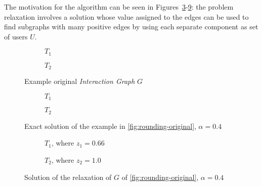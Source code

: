 The motivation for the algorithm can be seen in
Figures~\ref{fig:rounding-original}-\ref{fig:rounding-relaxed}: the problem
relaxation involves a solution whose value assigned to the edges can be used to
find subgraphs with many positive edges by using each separate component as set
of users $U$.

\begin{figure}
	\begin{center}
		\begin{subfigure}[b]{0.4\textwidth}
			\centering
			\caption{$T_1$}
			\label{fig:rounding-original-t1}
		\end{subfigure}
		\begin{subfigure}[b]{0.4\textwidth}
			\centering
			\caption{$T_2$}
			\label{fig:rounding-original-t2}
		\end{subfigure}
	\end{center}
	\caption{Example original \emph{Interaction Graph} $G$}
	\label{fig:rounding-original}
\end{figure}
\begin{figure}
	\begin{center}
		\begin{subfigure}[b]{0.4\textwidth}
			\centering
			\caption{$T_1$}
			\label{fig:rounding-integer-t1}
		\end{subfigure}
		\begin{subfigure}[b]{0.4\textwidth}
			\centering
			\caption{$T_2$}
			\label{fig:rounding-original-t2}
		\end{subfigure}
	\end{center}
	\caption{Exact solution of the example in \autoref{fig:rounding-original},
		$\alpha = 0.4$}
	\label{fig:rounding-integer}
\end{figure}
\begin{figure}
	\begin{center}
		\begin{subfigure}[b]{0.4\textwidth}
			\centering
			\caption{$T_1$, where $z_1 = 0.66$}
			\label{fig:rounding-relaxed-t1}
		\end{subfigure}
		\begin{subfigure}[b]{0.4\textwidth}
			\centering
			\caption{$T_2$, where $z_2 = 1.0$}
			\label{fig:rounding-relaxed-t2}
		\end{subfigure}
	\end{center}
	\caption{Solution of the relaxation of $G$ of
		\autoref{fig:rounding-original}, $\alpha = 0.4$}
	\label{fig:rounding-relaxed}
\end{figure}

